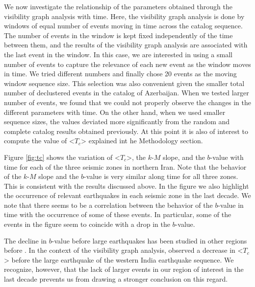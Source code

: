 We now investigate the relationship of the parameters obtained through the visibility graph analysis with time. Here, the visibility graph analysis is done by windows of equal number of events moving in time across the catalog sequence. The number of events in the window is kept fixed independently of the time between them, and the results of the visibility graph analysis are associated with the last event in the window. In this case, we are interested in using a small number of events to capture the relevance of each new event as the window moves in time. We tried different numbers and finally chose 20 events as the moving window sequence size. This selection was also convenient given the smaller total number of declustered events in the catalog of Azerbaijan. When we tested larger number of events, we found that we could not properly observe the changes in the different parameters with time. On the other hand, when we used smaller sequence sizes, the values deviated more significantly from the random and complete catalog results obtained previously. At this point it is also of interest to compute the value of <$T_c$> explained int he Methodology section.

Figure \ref{fig:tc} shows the variation of <$T_c$>, the $k$-$M$ slope, and the $b$-value with time for each of the three seismic zones in northern Iran. Note that the behavior of the $k$-$M$ slope and the $b$-value is very similar along time for all three zones. This is consistent with the results discussed above. In the figure we also highlight the occurrence of relevant earthquakes in each seismic zone in the last decade. We note that there seems to be a correlation between the behavior of the $b$-value in time with the occurrence of some of these events. In particular, some of the events in the figure seem to coincide with a drop in the $b$-value. 

The decline in $b$-value before large earthquakes has been studied in other regions before \citep[e.g.,][]{Wyss2000, Wyss2006, Schorlemmer2005, Chan2012}. In the context of the visibility graph analysis, \citet{Telesca2016} observed a decrease in <$T_c$> before the large earthquake of the western India earthquake sequence. We recognize, however, that the lack of larger events in our region of interest in the last decade prevents us from drawing a stronger conclusion on this regard. 
